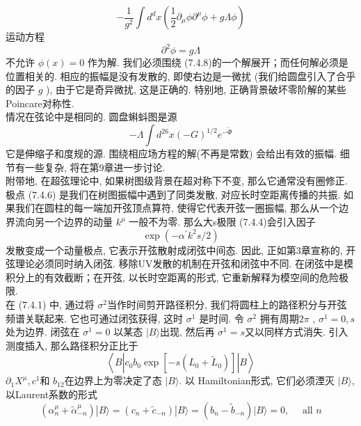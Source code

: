 \begin{equation}
	-\frac{1}{g^{2}} \int d^{d} x\left(\frac{1}{2} \partial_{\mu} \phi \partial^{\mu} \phi+g \Lambda \phi\right)
\end{equation}
运动方程
\begin{equation}
	\partial^{2} \phi=g \Lambda
\end{equation}
不允许 $\phi(x)=0$ 作为解. 我们必须围绕 (7.4.8)的一个解展开；而任何解必须是位置相关的. 相应的振幅是没有发散的, 即使右边是一微扰 (我们给圆盘引入了合乎的因子 $g$ ), 由于它是奇异微扰, 这是正确的. 特别地, 正确背景破坏零阶解的某些Poincare对称性.\\
情况在弦论中是相同的. 圆盘蝌蚪图是源
\begin{equation}
	-\Lambda \int d^{26} x(-G)^{1 / 2} e^{-\tilde{\Phi}}
\end{equation}
它是伸缩子和度规的源. 围绕相应场方程的解(不再是常数) 会给出有效的振幅. 细节有一些复杂, 将在第9章进一步讨论.\\
附带地, 在超弦理论中, 如果树图级背景在超对称下不变, 那么它通常没有圈修正.\\
极点 (7.4.6) 是我们在树图振幅中遇到了同类发散, 对应长时空距离传播的共振. 如果我们在圆柱的每一端加开弦顶点算符, 使得它代表开弦一圈振幅, 那么从一个边界流向另一个边界的动量 $k^{\mu}$ 一般不为零. 那么大s极限 (7.4.4)会引入因子
\begin{equation}
	\exp \left(-\alpha^{\prime} k^{2} s / 2\right)
\end{equation}
发散变成一个动量极点, 它表示开弦散射成闭弦中间态. 因此, 正如第3章宣称的, 开弦理论必须同时纳入闭弦. 移除UV发散的机制在开弦和闭弦中不同. 在闭弦中是模积分上的有效截断；在开弦, 以长时空距离的形式, 它重新解释为模空间的危险极限.\\
在 (7.4.1) 中, 通过将 $\sigma^{2}$当作时间剪开路径积分, 我们将圆柱上的路径积分与开弦频谱关联起来. 它也可通过闭弦获得, 这时 $\sigma^{1}$ 是时间. 令 $\sigma^{2}$ 拥有周期$2 \pi$ , $\sigma^{1}=0, s$处为边界. 闭弦在 $\sigma^{1}=0$ 以某态 $|B\rangle$出现, 然后再 $\sigma^{1}=s $又以同样方式消失. 引入测度插入, 那么路径积分正比于
\begin{equation}
	\left\langle B\left|c_{0} b_{0} \exp \left[-s\left(L_{0}+\tilde{L}_{0}\right)\right]\right| B\right\rangle
\end{equation}
$\partial_{1} X^{\mu}, c^{1}$和 $b_{12}$在边界上为零决定了态 $|B\rangle$. 以 Hamiltonian形式, 它们必须湮灭 $|B\rangle$, 以Laurent系数的形式
\begin{equation}
	\left(\alpha_{n}^{\mu}+\tilde{\alpha}_{-n}^{\mu}\right)|B\rangle=\left(c_{n}+\tilde{c}_{-n}\right)|B\rangle=\left(b_{n}-\tilde{b}_{-n}\right)|B\rangle=0, \quad \text { all } n
\end{equation}
